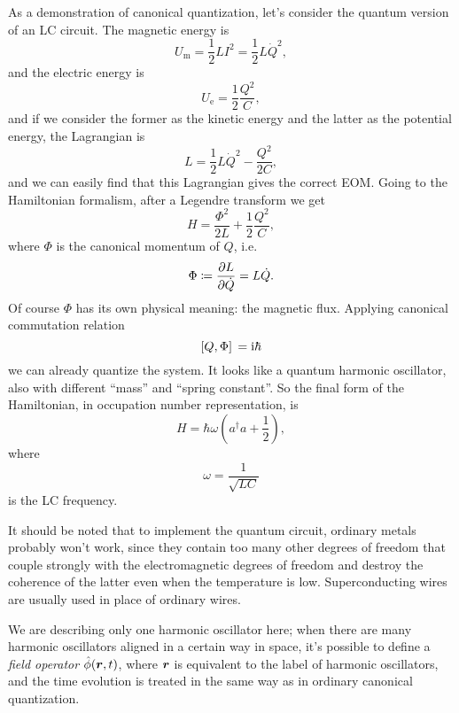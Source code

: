 \documentclass[hyperref, a4paper]{article}
\newcommand*{\ii}{\mathrm{i}}
\begin{document}
As a demonstration of canonical quantization, 
let's consider the quantum version of an LC circuit.
The magnetic energy is 
\begin{equation}
    U_\text{m} = \frac{1}{2} LI^2 = \frac{1}{2}L \dot{Q}^2 ,
\end{equation}
and the electric energy is 
\begin{equation}
    U_{\text{e}} = \frac{1}{2} \frac{Q^2}{C},
\end{equation}
and if we consider the former as the kinetic energy 
and the latter as the potential energy,
the Lagrangian is 
\begin{equation}
    L = \frac{1}{2} L \dot{Q}^2 - \frac{Q^2}{2C},
\end{equation}
and we can easily find that this Lagrangian gives the correct EOM.
Going to the Hamiltonian formalism, 
after a Legendre transform we get 
\begin{equation}
    H = \frac{\Phi^2}{2L} + \frac{1}{2} \frac{Q^2}{C},
\end{equation}
where $\Phi$ is the canonical momentum of $Q$, i.e. 
\begin{equation}
    \Phi \coloneqq \pdv{L}{\dot{Q}} = L \dot{Q}.
\end{equation}
Of course $\Phi$ has its own physical meaning:
the magnetic flux.
Applying canonical commutation relation 
\begin{equation}
    \comm*{Q}{\Phi} = \ii \hbar 
\end{equation}
 we can already quantize the system.
It looks like a quantum harmonic oscillator,
also with different ``mass'' and ``spring constant''.
So the final form of the Hamiltonian,
in occupation number representation, is 
\begin{equation}
    H = \hbar \omega \left(
        a^\dagger a + \frac{1}{2}
    \right),
\end{equation}
where 
\begin{equation}
    \omega = \frac{1}{\sqrt{LC}}
\end{equation}
is the LC frequency. 

It should be noted that to implement the quantum circuit, 
ordinary metals probably won't work, 
since they contain too many other degrees of freedom 
that couple strongly with the electromagnetic degrees of freedom 
and destroy the coherence of the latter 
even when the temperature is low.
Superconducting wires are usually used in place of ordinary wires.

We are describing only one harmonic oscillator here; 
when there are many harmonic oscillators aligned in a certain way in space, 
it's possible to define a \emph{field operator} $\hat{\phi}(\vb*{r}, t)$,
where $\vb*{r}$ is equivalent to the label of harmonic oscillators,
and the time evolution is treated in the same way 
as in ordinary canonical quantization.
\end{document}
